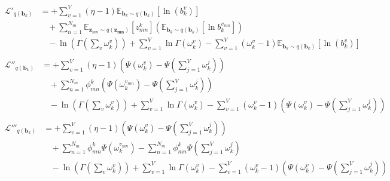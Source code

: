 \documentclass[a4]{article}
\begin{document}
\begin{equation}
\begin{aligned}
    \mathcal{L}'_{q(\mathbf{b}_{k})}
&=
    + \sum_{v=1}^{V} (\eta - 1) 
      \mathbb{E}_{\mathbf{b}_k \sim q(\mathbf{b}_k)}
      [\ln(b_k^v)]\\
&\:\:\:\:+
    \sum_{n=1}^{N_m}
        \mathbb{E}_{\mathbf{z}_{mn} \sim q(\mathbf{z_{mn}})} [z_{mn}^{k}] 
        \left( \mathbb{E}_{\mathbf{b}_k \sim q(\mathbf{b}_k)}
              [\ln b_{k}^{v_{mn}}]
        \right)\\
&\:\:\:\:
      - \ln \left( \Gamma( \sum_v \omega_k^v ) \right) 
          + \sum_{v=1}^{V} \ln \Gamma(\omega_k^v) 
          - \sum_{v=1}^{V} (\omega_k^v - 1)
            \mathbb{E}_{\mathbf{b}_k \sim q(\mathbf{b}_k)}[\ln(b_k^v)]\\
\end{aligned}
\end{equation}
\begin{equation}
\begin{aligned}
    \mathcal{L}''_{q(\mathbf{b}_{k})}
&=
    + \sum_{v=1}^{V} (\eta - 1)
      \left(
          \Psi( \omega_{k}^v ) - \Psi( \sum_{j=1}^{V} \omega_{k}^j )
      \right)\\
&\:\:\:\:+
      \sum_{n=1}^{N_m} \phi_{mn}^{k}
      \left(
          \Psi( \omega_{k}^{v_{mn}} ) - \Psi( \sum_{j=1}^{V} \omega_{k}^j )
      \right)\\
&\:\:\:\:
      - \ln \left( \Gamma( \sum_v \omega_k^v ) \right)
          + \sum_{v=1}^{V} \ln \Gamma( \omega_k^v ) 
          - \sum_{v=1}^{V} ( \omega_k^v - 1 )
            \left(
                \Psi( \omega_{k}^v ) - \Psi( \sum_{j=1}^{V} \omega_{k}^j )
            \right)\\
\end{aligned}
\end{equation}
\begin{equation}
\begin{aligned}
    \mathcal{L}'''_{q(\mathbf{b}_{k})}
&=
    + \sum_{v=1}^{V} (\eta - 1)
      \left(
          \Psi( \omega_{k}^v ) - \Psi( \sum_{j=1}^{V} \omega_{k}^j )
      \right)\\
&\:\:\:\:+
      \sum_{n=1}^{N_m} \phi_{mn}^{k}\Psi( \omega_{k}^{v_{mn}} )
      - \sum_{n=1}^{N_m} \phi_{mn}^{k}\Psi( \sum_{j=1}^{V} \omega_{k}^j )\\
&\:\:\:\:
      - \ln \left( \Gamma( \sum_v \omega_k^v ) \right)
          + \sum_{v=1}^{V} \ln \Gamma( \omega_k^v ) 
          - \sum_{v=1}^{V} ( \omega_k^v - 1 )
            \left(
                \Psi( \omega_{k}^v ) - \Psi( \sum_{j=1}^{V} \omega_{k}^j )
            \right)\\
\end{aligned}
\end{equation}
\end{document}
